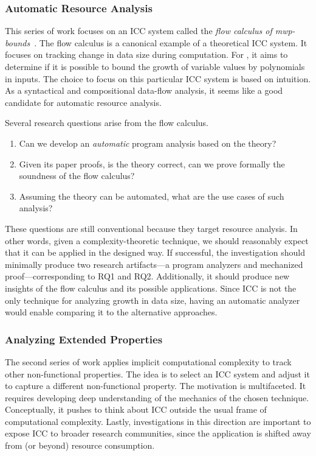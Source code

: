 \subsubsection{Automatic Resource Analysis}
\label{subsec:aicc-automatic-resource-analysis}

This series of work focuses on an ICC system called the \emph{flow calculus of
mwp-bounds}~\cite{jones2009}. The flow calculus is a
canonical example of a theoretical ICC system. It focuses on tracking change in
data size during computation. For , it aims to
determine if it is possible to bound the growth of variable values by
polynomials in inputs. The choice to focus on this particular ICC system is
based on intuition. As a syntactical and compositional data-flow analysis, it
{seems like} a good candidate for automatic resource analysis.

Several research questions arise from the flow calculus.

\begin{enumerate}[label={(RQ\arabic*)},leftmargin=*,labelindent=1em]
\item Can we develop an \emph{automatic} program analysis based on the theory?
\item Given its paper proofs, is the theory correct, \ie can we prove formally
the soundness of the flow calculus?
\item Assuming the theory can be automated, what are the use cases of such
analysis?
\end{enumerate}

These questions are still conventional because they target resource analysis. In
other words, given a complexity-theoretic technique, we should reasonably expect
that it can be applied in the designed way. If successful, the investigation
should minimally produce two research artifacts---a program analyzers and
mechanized proof---corresponding to RQ1 and RQ2. Additionally, it should produce
new insights of the flow calculus and its possible applications. Since ICC is
not the only technique for analyzing growth in data size, having an automatic
analyzer would enable comparing it to the alternative approaches.

\subsubsection{Analyzing Extended Properties}
\label{subsec:extended-props}

The second series of work applies implicit computational complexity to track
{other} non-functional properties. The idea is to
select an ICC system and adjust it to capture a different non-functional
property. The motivation is multifaceted. It requires developing deep
understanding of the mechanics of the chosen technique. Conceptually, it pushes
to think about ICC outside the usual frame of computational complexity. Lastly,
investigations in this direction are important to expose ICC to broader research
communities, since the application is shifted away from (or beyond) resource
consumption.

